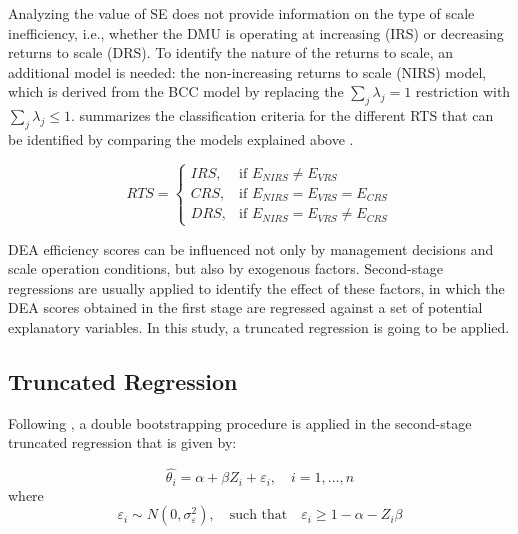 Analyzing the value of SE does not provide information on the type of scale inefficiency, i.e., whether
the DMU is operating at increasing (IRS) or decreasing returns to scale (DRS). To identify the nature of the returns to
scale, an additional model is needed: the non-increasing returns to scale (NIRS) model, which is derived
from the BCC model by replacing the \(\sum_j \lambda_j = 1\) restriction with \(\sum_j \lambda_j \leq 1\).  summarizes the classification criteria for the different RTS that can be identified
by comparing the models explained above \cite{huguenin2012}.
\vspace{-0.5cm}

\begin{equation}
\label{eq:rts_definition}
RTS =
\begin{cases}
IRS, & \text{if } E_{NIRS} \neq E_{VRS} \\
CRS, & \text{if } E_{NIRS} = E_{VRS} = E_{CRS} \\
DRS, & \text{if } E_{NIRS} = E_{VRS} \neq E_{CRS}
\end{cases}
\end{equation}
 \vspace{-0.3cm}

DEA efficiency scores can be influenced not only by management decisions and scale
operation conditions, but also by exogenous factors. Second-stage regressions are usually
applied to identify the effect of these factors, in which the DEA scores obtained in the first
stage are regressed against a set of potential explanatory variables. In this study, a truncated regression
is going to be applied.

\subsection{Truncated Regression} 
\label{truncreg}

Following \cite{simar2007}, a double bootstrapping procedure is applied in the second-stage
truncated regression that is given by:
\vspace{-0.3cm}

\begin{equation}
\label{eq:regression}
\hat{\theta_i}=\alpha+\beta Z_i + \varepsilon_i, \quad i=1,\ldots,n   
\end{equation}
\vspace{-0.1cm}
where
\vspace{-0.1cm}
\begin{equation}
\label{eq:noise}
\varepsilon_i \sim N(0, \sigma_\varepsilon^2), \quad \text{such that} \quad \varepsilon_i \geq 1 - \alpha - Z_i \beta
\end{equation}
\vspace{-0.6cm}

